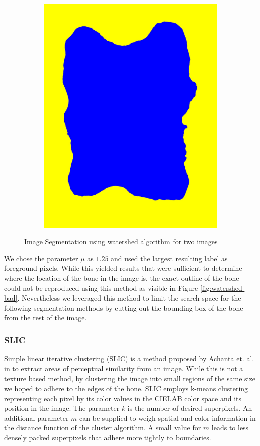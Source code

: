 \documentclass[pdftex,12pt,a4paper]{report}
\begin{document}
\begin{figure}[h]
\begin{subfigure}[b]{0.24\textwidth}
		\includegraphics[width=.9\linewidth]{img/segmentation/bad/watershed/segmented.jpg}
		\subcaption*{}
		\label{}
	\end{subfigure}
	\caption{Image Segmentation using watershed algorithm for two images}
	\label{fig:watershed}
\end{figure}

We chose the parameter $\mu$ as $1.25$ and used the largest resulting label as foreground pixels. While this yielded results that were sufficient to determine where the  location of the bone in the image is, the exact outline of the bone could not be reproduced using this method as visible in Figure \ref{fig:watershed-bad}. Nevertheless we leveraged this method to limit the search space for the following segmentation methods by cutting out the bounding box of the bone from the rest of the image.

\subsubsection{SLIC}

Simple linear iterative clustering (SLIC) is a method proposed by Achanta et. al. in \cite{achanta2012slic} to extract areas of perceptual similarity from an image. While this is not a texture based method, by clustering the image into small regions of the same size we hoped to adhere to the edges of the bone. SLIC employs k-means clustering representing each pixel by its color values in the CIELAB color space and its position in the image. The parameter $k$ is the number of desired superpixels. An additional parameter $m$ can be supplied to weigh spatial and color information in the distance function of the cluster algorithm. A small value for $m$ leads to less densely packed superpixels that adhere more tightly to boundaries.
\end{document}
